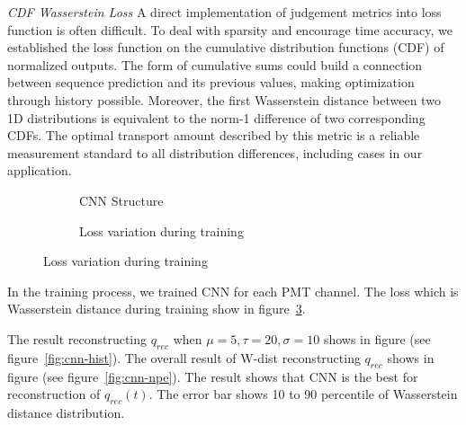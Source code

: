 \emph{CDF Wasserstein Loss}
A direct implementation of judgement metrics into loss function is often difficult. To deal with sparsity and encourage time accuracy, we established the loss function on the cumulative distribution functions (CDF) of normalized outputs. The form of cumulative sums could build a connection between sequence prediction and its previous values, making optimization through history possible. Moreover, the first Wasserstein distance between two 1D distributions is equivalent to the norm-1 difference of two corresponding CDFs. The optimal transport amount described by this metric is a reliable measurement standard to all distribution differences, including cases in our application.

\begin{figure}[H]
\begin{minipage}[b]{.4\textwidth}
\begin{figure}[H]
    \begin{center}
    \begin{adjustbox}{width=0.6\textwidth}
        
    \end{adjustbox}
    \end{center}
    \caption{\label{fig:struct} CNN Structure}
\end{figure}
\end{minipage}
\begin{minipage}[b]{.6\textwidth}
\begin{figure}[H]
    \centering
    \resizebox{\textwidth}{!}{}
    \caption{\label{fig:loss} Loss variation during training}
\end{figure}
\end{minipage}
\end{figure}

In the training process, we trained CNN for each PMT channel. The loss which is Wasserstein distance during training show in figure~\ref{fig:loss}. 

The result reconstructing $q_{rec}$ when $\mu=5, \tau=20, \sigma=10$ shows in figure (see figure~\ref{fig:cnn-hist}). The overall result of W-dist reconstructing $q_{rec}$ shows in figure (see figure~\ref{fig:cnn-npe}). The result shows that CNN is the best for reconstruction of $q_{rec}(t)$. The error bar shows 10 to 90 percentile of Wasserstein distance distribution. 

